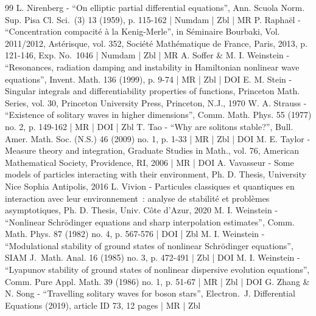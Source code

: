 \begin{thebibliography}{99}
L. Nirenberg - “On elliptic partial differential equations”, Ann. Scuola Norm. Sup. Pisa Cl. Sci. (3) 13 (1959), p. 115-162 | Numdam | Zbl | MR
P. Raphaël - “Concentration compacité à la Kenig-Merle”, in Séminaire Bourbaki, Vol. 2011/2012, Astérisque, vol. 352, Société Mathématique de France, Paris, 2013, p. 121-146, Exp. No. 1046 | Numdam | Zbl | MR
A. Soffer \& M. I. Weinstein - “Resonances, radiation damping and instability in Hamiltonian nonlinear wave equations”, Invent. Math. 136 (1999), p. 9-74 | MR | Zbl | DOI
E. M. Stein - Singular integrals and differentiability properties of functions, Princeton Math. Series, vol. 30, Princeton University Press, Princeton, N.J., 1970
W. A. Strauss - “Existence of solitary waves in higher dimensions”, Comm. Math. Phys. 55 (1977) no. 2, p. 149-162 | MR | DOI | Zbl
T. Tao - “Why are solitons stable?”, Bull. Amer. Math. Soc. (N.S.) 46 (2009) no. 1, p. 1-33 | MR | Zbl | DOI
M. E. Taylor - Measure theory and integration, Graduate Studies in Math., vol. 76, American Mathematical Society, Providence, RI, 2006 | MR | DOI
A. Vavasseur - Some models of particles interacting with their environment, Ph. D. Thesis, University Nice Sophia Antipolis, 2016
L. Vivion - Particules classiques et quantiques en interaction avec leur environnement : analyse de stabilité et problèmes asymptotiques, Ph. D. Thesis, Univ. Côte d’Azur, 2020
M. I. Weinstein - “Nonlinear Schrödinger equations and sharp interpolation estimates”, Comm. Math. Phys. 87 (1982) no. 4, p. 567-576 | DOI | Zbl
M. I. Weinstein - “Modulational stability of ground states of nonlinear Schrödinger equations”, SIAM J. Math. Anal. 16 (1985) no. 3, p. 472-491 | Zbl | DOI
M. I. Weinstein - “Lyapunov stability of ground states of nonlinear dispersive evolution equations”, Comm. Pure Appl. Math. 39 (1986) no. 1, p. 51-67 | MR | Zbl | DOI
G. Zhang \& N. Song - “Travelling solitary waves for boson stars”, Electron. J. Differential Equations (2019), article ID 73, 12 pages | MR | Zbl
\end{thebibliography}
